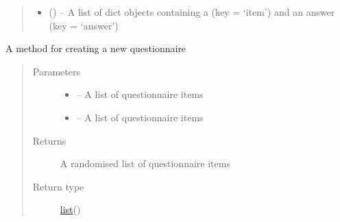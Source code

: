 \documentclass[letterpaper,10pt,english]{sphinxmanual}
\begin{document}
\begin{fulllineitems}
\begin{fulllineitems}
\begin{quote}
\begin{description}
\begin{itemize}
\item {} 
 (\href{https://docs.python.org/2/library/stdtypes.html\#dict}{}) -- A list of dict objects containing a  (key = `item') and an answer (key = `answer')

\end{itemize}

\end{description}\end{quote}

\end{fulllineitems}


\begin{fulllineitems}
\label{\detokenize{user:user.User.create_questionnaire}}
A method for creating a new questionnaire
\begin{quote}\begin{description}
\item[{Parameters}] \leavevmode\begin{itemize}
\item {} 
 -- A list of questionnaire items

\item {} 
 -- A list of questionnaire items

\end{itemize}

\item[{Returns}] \leavevmode
A randomised list of questionnaire items

\item[{Return type}] \leavevmode
\href{https://docs.python.org/2/library/functions.html\#list}{list}({\hyperref[\detokenize{questionnaire_item:questionnaire_item.QuestionnaireItem}]{}})

\end{description}\end{quote}

\end{fulllineitems}



\end{fulllineitems}
\end{document}
